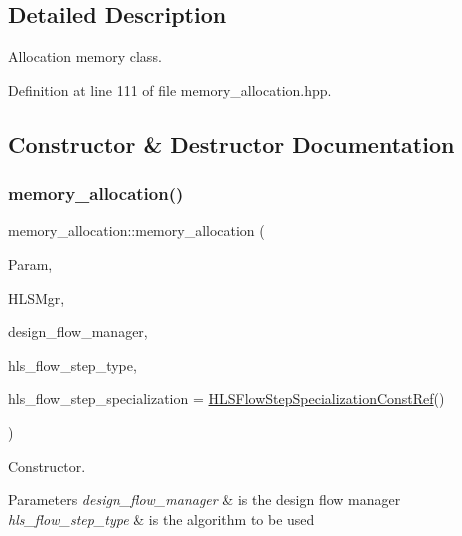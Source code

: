 \subsection{Detailed Description}
Allocation memory class. 

Definition at line 111 of file memory\+\_\+allocation.\+hpp.



\subsection{Constructor \& Destructor Documentation}
\mbox{\label{classmemory__allocation_a33e5867e0afa36110b75e50885414a6b}} 
\subsubsection{\texorpdfstring{memory\+\_\+allocation()}{memory\_allocation()}}
{\footnotesize\ttfamily memory\+\_\+allocation\+::memory\+\_\+allocation (\begin{DoxyParamCaption}\item[{const \hyperlink{Parameter_8hpp_a37841774a6fcb479b597fdf8955eb4ea}{Parameter\+Const\+Ref}}]{Param,  }\item[{const \hyperlink{hls__manager_8hpp_acd3842b8589fe52c08fc0b2fcc813bfe}{H\+L\+S\+\_\+manager\+Ref}}]{H\+L\+S\+Mgr,  }\item[{const Design\+Flow\+Manager\+Const\+Ref}]{design\+\_\+flow\+\_\+manager,  }\item[{const \hyperlink{hls__step_8hpp_ada16bc22905016180e26fc7e39537f8d}{H\+L\+S\+Flow\+Step\+\_\+\+Type}}]{hls\+\_\+flow\+\_\+step\+\_\+type,  }\item[{const \hyperlink{hls__step_8hpp_a5fdd2edf290c196531d21d68e13f0e74}{H\+L\+S\+Flow\+Step\+Specialization\+Const\+Ref}}]{hls\+\_\+flow\+\_\+step\+\_\+specialization = {\ttfamily \hyperlink{hls__step_8hpp_a5fdd2edf290c196531d21d68e13f0e74}{H\+L\+S\+Flow\+Step\+Specialization\+Const\+Ref}()} }\end{DoxyParamCaption})}



Constructor. 


\begin{DoxyParams}{Parameters}
{\em design\+\_\+flow\+\_\+manager} & is the design flow manager \\
\hline
{\em hls\+\_\+flow\+\_\+step\+\_\+type} & is the algorithm to be used \\
\hline
\end{DoxyParams}


